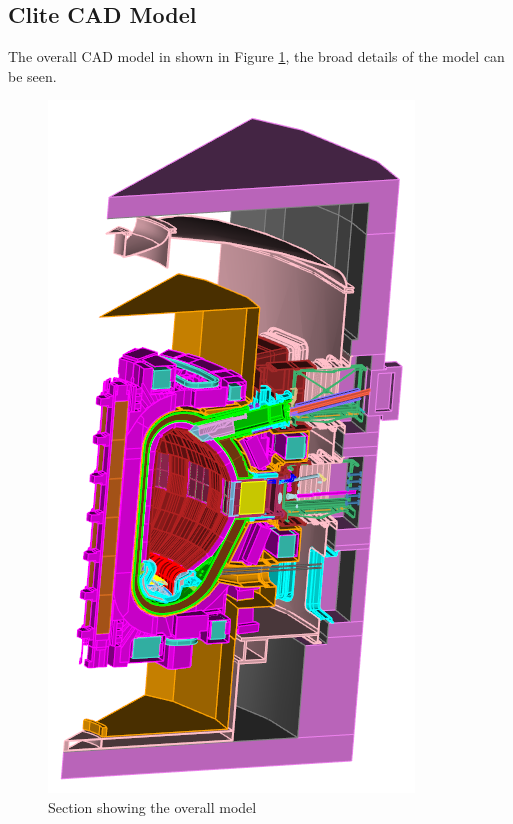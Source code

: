 \documentclass[12pt]{article}
\begin{document}
\subsection{Clite CAD Model}
The overall CAD model in shown in Figure \ref{fig:cad_iter_global}, the broad details of the model can be seen.
\begin{figure}[p]
  \centering
  \includegraphics[scale=0.8]{../plots/cad/global.png}
  \caption{Section showing the overall model}
  \label{fig:cad_iter_global}
\end{figure}
\end{document}
